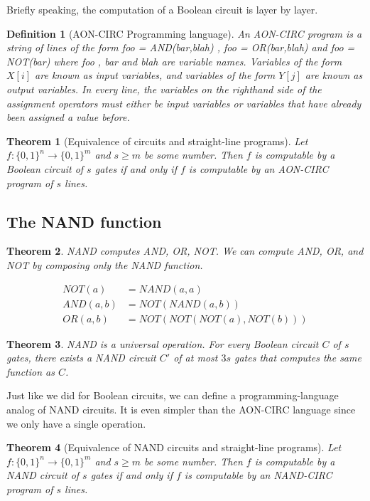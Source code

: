 \documentclass[aps,pra,onecolumn,notitlepage,superscriptaddress]{revtex4-1}
\newtheorem{theo}{Theorem}
\newtheorem{defi}{Definition}
\begin{document}
    Briefly speaking, the computation of a Boolean circuit is layer by layer.

    \begin{defi} [AON-CIRC Programming language]
        An AON-CIRC program is a string of lines of the form foo = AND(bar,blah) , foo = OR(bar,blah) and foo = NOT(bar) where foo , bar and blah are variable names. Variables of the form $X[i]$ are known as input variables, and variables of the form $Y[j]$ are known as output variables. In every line, the variables on the righthand side of the assignment operators must either be input variables or variables that have already been assigned a value before.
    \end{defi}

    \begin{theo}[Equivalence of circuits and straight-line programs]
        Let $f: \{0,1\}^n \rightarrow \{0,1\}^m$ and $s \geq m$ be some number. Then $f$ is
        computable by a Boolean circuit of $s$ gates if and only if $f$ is computable by an AON-CIRC program of $s$ lines.
    \end{theo}

    \subsection{The NAND function}
    \begin{theo}
        NAND computes AND, OR, NOT. We can compute AND, OR, and NOT by composing only the NAND function.
    \end{theo}
    \begin{align*}
        NOT(a) &= NAND(a,a) \\
        AND(a,b) &= NOT(NAND(a,b)) \\
        OR(a,b) &= NOT(NOT(NOT(a),NOT(b)))
    \end{align*}

    \begin{theo}
        NAND is a universal operation. For every Boolean circuit $C$ of $s$ gates, there exists a NAND circuit $C'$ of at most $3s$ gates that computes the same function as $C$.
    \end{theo}

    Just like we did for Boolean circuits, we can define a programming-language analog of NAND circuits. It is even simpler than the AON-CIRC language since we only have a single operation. 

    \begin{theo}[Equivalence of NAND circuits and straight-line programs]
        Let $f: \{0,1\}^n \rightarrow \{0,1\}^m$ and $s \geq m$ be some number. Then $f$ is
        computable by a NAND circuit of $s$ gates if and only if $f$ is computable by an NAND-CIRC program of $s$ lines.
    \end{theo}


    
\end{document}
